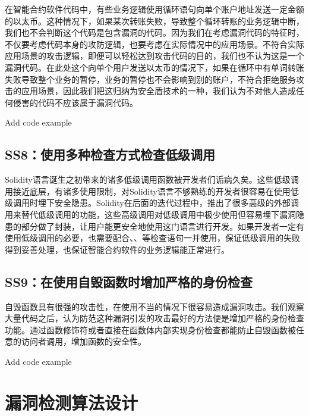在智能合约软件代码中，有些业务逻辑使用循环语句向单个账户地址发送一定金额的以太币。这种情况下，如果某次转账失败，导致整个循环转账的业务逻辑中断，我们也不会判断这个代码是包含漏洞的代码。因为我们在考虑漏洞代码的特征时，不仅要考虑代码本身的攻防逻辑，也要考虑在实际情况中的应用场景。不符合实际应用场景的攻击逻辑，即便可以轻松达到攻击代码的目的，我们也不认为这是一个漏洞代码。在此处这个向单个用户发送以太币的情况下，如果在循环中有单词转账失败导致整个业务的暂停，业务的暂停也不会影响到别的账户，不符合拒绝服务攻击的应用场景，因此我们把这归纳为安全盾技术的一种，我们认为不对他人造成任何侵害的代码不应该属于漏洞代码。

\textcolor[rgb]{1.00,0.00,0.00}{Add code example}

\subsection{SS8：使用多种检查方式检查低级调用}\label{sec:ss8}

Solidity语言诞生之初带来的诸多低级调用函数被开发者们诟病久矣。这些低级调用接近底层，有诸多使用限制，对Solidity语言不够熟练的开发者很容易在使用低级调用时埋下安全隐患。Solidity在后面的迭代过程中，推出了很多高级的外部调用来替代低级调用的功能，这些高级调用对低级调用中极少使用但容易埋下漏洞隐患的部分做了封装，让用户能更安全地使用这门语言进行开发。如果开发者一定有使用低级调用的必要，也需要配合、、等检查语句一并使用，保证低级调用的失败得到妥善处理，也保证智能合约软件的业务逻辑能正常进行。

\subsection{SS9：在使用自毁函数时增加严格的身份检查}\label{sec:ss9}

自毁函数具有很强的攻击性，在使用不当的情况下很容易造成漏洞攻击。我们观察大量代码之后，认为防范这种漏洞引发的攻击最好的方法便是增加严格的身份检查功能。通过函数修饰符或者直接在函数体内部实现身份检查都能防止自毁函数被任意的访问者调用，增加函数的安全性。

\textcolor[rgb]{1.00,0.00,0.00}{Add code example}

\section{漏洞检测算法设计}

